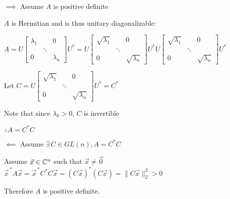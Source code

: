 \documentclass[letterpaper,12pt,fleqn]{article}
\newcommand{\vx}{\vec{x}}
\newcommand{\vxct}{\vx^{\,*}}
\newcommand{\vz}{\vec{0}}
\renewcommand{\l}{\lambda}
\begin{document}
\begin{theproof}
  \listbreak
  \begin{description}
  \item $\implies$ Assume $A$ is positive definite

    $A$ is Hermitian and is thus unitary diagonalizable:
    
    $A=U\begin{bmatrix}
    \l_1 & & 0 \\
    & \ddots & \\
    0 & & \l_n
    \end{bmatrix}U^*=U\begin{bmatrix}
    \sqrt{\l_1} & & 0 \\
    & \ddots & \\
    0 & & \sqrt{\l_n}
    \end{bmatrix}U^*U\begin{bmatrix}
    \sqrt{\l_1} & & 0 \\
    & \ddots & \\
    0 & & \sqrt{\l_n}\end{bmatrix}U^*$

    Let $C=U\begin{bmatrix}
    \sqrt{\l_1} & & 0 \\
    & \ddots & \\
    0 & & \sqrt{\l_n}
    \end{bmatrix}U^*=C^*$

    Note that since $\l_k>0$, $C$ is invertible

    $\therefore A=C^*C$

  \item $\impliedby$ Assume $\exists\,C\in GL(n),A=C^*C$

    Assume $\vx\in\C^n$ such that $\vx\ne\vz$ \\
    $\vxct A\vx=\vxct C^*C\vx=(C\vx)^*(C\vx)=\|C\vx\|_2^2>0$

    Therefore $A$ is positive definite.
  \end{description}
\end{theproof}

\newcommand{\ema}{\begin{bmatrix}
    1 & 1 & 1 \\
    1 & 2 & 3 \\
    1 & 3 & 6
  \end{bmatrix}
}
\newcommand{\emb}{\begin{bmatrix}
    1 & 1 & 1 \\
    0 & 1 & 2 \\
    0 & 0 & 1
  \end{bmatrix}
}
\end{document}
